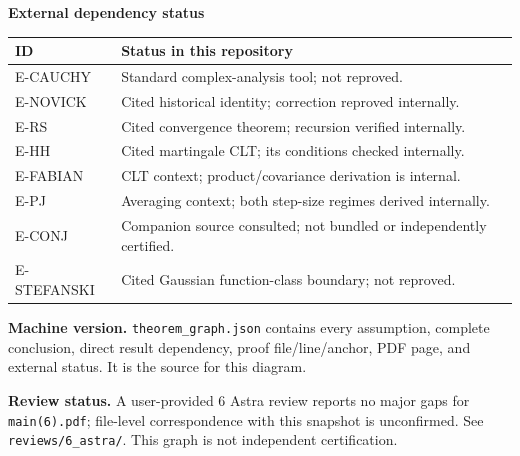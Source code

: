 \documentclass[10pt]{article}
\begin{document}
\begin{minipage}[t]{.49\linewidth}
\textbf{External dependency status}\par\small
\begin{tabular}{@{}p{.23\linewidth}p{.67\linewidth}@{}}\toprule
ID & Status in this repository \\\midrule
E-CAUCHY & Standard complex-analysis tool; not reproved. \\
E-NOVICK & Cited historical identity; correction reproved internally. \\
E-RS & Cited convergence theorem; recursion verified internally. \\
E-HH & Cited martingale CLT; its conditions checked internally. \\
E-FABIAN & CLT context; product/covariance derivation is internal. \\
E-PJ & Averaging context; both step-size regimes derived internally. \\
E-CONJ & Companion source consulted; not bundled or independently certified. \\
E-STEFANSKI & Cited Gaussian function-class boundary; not reproved. \\
\bottomrule\end{tabular}\par
\textbf{Machine version.} \texttt{theorem\_graph.json} contains every assumption, complete conclusion, direct result dependency, proof file/line/anchor, PDF page, and external status. It is the source for this diagram.\par
\textbf{Review status.} A user-provided 6 Astra review reports no major gaps for \texttt{main(6).pdf}; file-level correspondence with this snapshot is unconfirmed. See \texttt{reviews/6\_astra/}. This graph is not independent certification.
\end{minipage}
\end{document}
